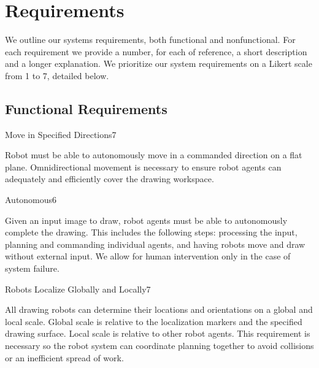 
\section{Requirements}
\label{sec:requirements}
We outline our systems requirements, both functional and nonfunctional. For each requirement we provide a number, for each of reference, a short description and a longer explanation. We prioritize our system requirements on a Likert scale from 1 to 7, detailed below. 



\subsection{Functional Requirements}
\label{sec:functional_requirements}

\begin{functional_requirement}{Move in Specified Directions}{7}
\item Robot must be able to autonomously move in a commanded direction on a flat plane. Omnidirectional movement is necessary to ensure robot agents can adequately and efficiently cover the drawing workspace.
\end{functional_requirement}

\pagebreak

\begin{functional_requirement}{Autonomous}{6}
\item Given an input image to draw, robot agents must be able to autonomously complete the drawing. This includes the following steps: processing the input, planning and commanding individual agents, and having robots move and draw without external input. We allow for human intervention only in the case of system failure. 
\end{functional_requirement}

\begin{functional_requirement}{Robots Localize Globally and Locally}{7}
\item All drawing robots can determine their locations and orientations on a global and local scale. Global scale is relative to the localization markers and the specified drawing surface. Local scale is relative to other robot agents. This requirement is necessary so the robot system can coordinate planning together to avoid collisions or an inefficient spread of work.
\end{functional_requirement}

